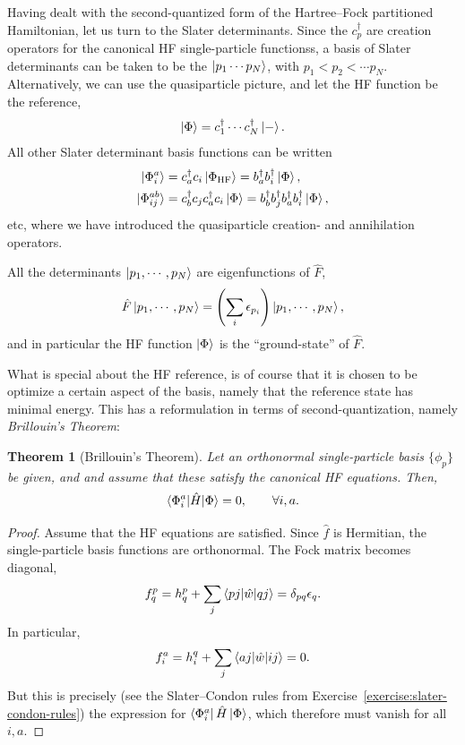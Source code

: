 \documentclass{report}
\theoremstyle{plain}
\newtheorem{theorem}{Theorem}[chapter]
\theoremstyle{definition}
\begin{document}
Having dealt with the second-quantized form of the Hartree--Fock
partitioned Hamiltonian, let us turn to the Slater determinants. Since
the $c^\dag_p$ are creation operators for the canonical HF
single-particle functionss, a
basis of Slater determinants can be taken to be the $\ket{p_1\cdots
  p_N}$, with $p_1<p_2<\cdots p_N$. Alternatively, we can
use the quasiparticle picture, and let the HF function be the
reference,
\begin{equation}
  \ket{\Phi} = c^\dag_1\cdots c^\dag_N \ket{-}.
\end{equation}
All other Slater determinant basis functions can be written
\begin{align}
  \ket{\Phi_i^a} &= c^\dag_a c_i \ket{\Phi_\text{HF}} = b^\dag_a
  b^\dag_i \ket{\Phi},\\
  \ket{\Phi_{ij}^{ab}} &= c^\dag_b c_j c^\dag_a c_i
  \ket{\Phi} = b^\dag_b b^\dag_j b^\dag_a
  b^\dag_i \ket{\Phi},
\end{align}
etc, where we have introduced the quasiparticle creation- and
annihilation operators. 

All the determinants $\ket{p_1,\cdots,p_N}$ are
eigenfunctions of $\hat{F}$,
\begin{equation}
  \hat{F} \ket{p_1,\cdots,p_N} = \left(\sum_i
    \epsilon_{p_i}\right)\ket{p_1,\cdots,p_N},
\end{equation}
and in particular the HF function $\ket{\Phi}$ is the ``ground-state''
of $\hat{F}$. 



What is special about the HF reference, is of course that it is chosen
to be optimize a certain aspect of the basis, namely that the
reference state has minimal energy. This has a reformulation in terms
of second-quantization,
namely \emph{Brillouin's Theorem}:
\begin{theorem}[Brillouin's Theorem]
  Let an orthonormal single-particle basis $\{\phi_p\}$ be given, and
  and assume that these satisfy the canonical HF equations. Then,
  \begin{equation} \label{eq:hf-singles}
    \braket{\Phi_{i}^a|\hat{H}|\Phi} = 0,\qquad \forall i,a.
  \end{equation}
\end{theorem}
\begin{proof}
  Assume that the HF equations are satisfied. Since $\hat{f}$ is
  Hermitian, the single-particle basis functions are orthonormal. The
  Fock matrix becomes diagonal,
  \begin{equation}
    f^{p}_q = h^p_q + \sum_j \braket{pj|\hat{w}|qj} = \delta_{pq}\epsilon_q.
  \end{equation}
  In particular, 
  \begin{equation}
    f^{a}_i = h^q_i + \sum_j \braket{aj|\hat{w}|ij} = 0.
  \end{equation}
  But this is precisely (see the Slater--Condon rules from
  Exercise~\ref{exercise:slater-condon-rules}) the expression for 
  $\bra{\Phi_{i}^a}\hat{H}\ket{\Phi}$, which therefore must
  vanish for all $i,a$.
\end{proof}
\end{document}

